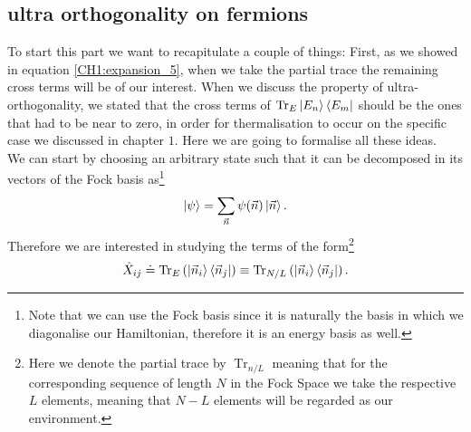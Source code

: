 \subsection{ultra orthogonality on fermions}
To start this part we want to recapitulate a couple of things: First, as we showed in equation \eqref{CH1:expansion_5}, when we take the partial trace the remaining cross terms  will be of our interest. When we discuss the property of ultra-orthogonality, we stated that the cross terms of $\operatorname{Tr}_{E}\mathinner{|{E_n}\rangle}\mathinner{\langle{E_m}|}$ should be the ones that had to be near to zero, in order for thermalisation to occur on the specific case we discussed in chapter $1$. Here we are going to formalise all these ideas.\\

\indent We can start by choosing an arbitrary state such that it can be decomposed in its vectors of the Fock basis as\footnote{Note that we can use the Fock basis since it is naturally the basis in which we diagonalise our Hamiltonian, therefore it is an energy basis as well.}
\begin{equation}
\mathinner{|{\psi}\rangle} = \sum_{\vec{n}}\psi(\vec{n})\mathinner{|{\vec{n}}\rangle}.
\end{equation}
Therefore we are interested in studying the terms of the form\footnote{Here we denote the partial trace by $\operatorname{Tr}_{n/L}$ meaning that for the corresponding sequence of length $N$ in the Fock Space we take the respective $L$ elements, meaning that $N-L$ elements will be regarded as our environment.}
\begin{equation}
\hat{X}_{ij} \doteq \operatorname{Tr}_{E}\left(\mathinner{|{\vec{n}_i}\rangle}\mathinner{\langle{\vec{n}_j}|}\right) \equiv \operatorname{Tr}_{N/L}\left(\mathinner{|{\vec{n}_i}\rangle}\mathinner{\langle{\vec{n}_j}|}\right).
\end{equation}
